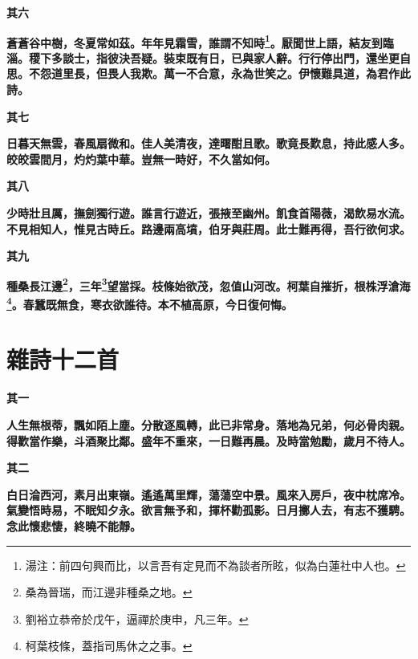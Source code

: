 \begin{quoting}\textbf{其六}\end{quoting}

\textbf{蒼蒼谷中樹，冬夏常如茲。年年見霜雪，誰謂不知時\footnote{湯注：前四句興而比，以言吾有定見而不為談者所眩，似為白蓮社中人也。}。厭聞世上語，結友到臨淄。稷下多談士，指彼決吾疑。裝束既有日，已與家人辭。行行停出門，還坐更自思。不怨道里長，但畏人我欺。萬一不合意，永為世笑之。伊懷難具道，為君作此詩。}

\begin{quoting}\textbf{其七}\end{quoting}

\textbf{日暮天無雲，春風扇微和。佳人美清夜，達曙酣且歌。歌竟長歎息，持此感人多。皎皎雲間月，灼灼葉中華。豈無一時好，不久當如何。}

\begin{quoting}\textbf{其八}\end{quoting}

\textbf{少時壯且厲，撫劍獨行遊。誰言行遊近，張掖至幽州。飢食首陽薇，渴飲易水流。不見相知人，惟見古時丘。路邊兩高墳，伯牙與莊周。此士難再得，吾行欲何求。}

\begin{quoting}\textbf{其九}\end{quoting}

\textbf{種桑長江邊\footnote{桑為晉瑞，而江邊非種桑之地。}，三年\footnote{劉裕立恭帝於戊午，逼禪於庚申，凡三年。}望當採。枝條始欲茂，忽值山河改。柯葉自摧折，根株浮滄海\footnote{柯葉枝條，蓋指司馬休之之事。}。春蠶既無食，寒衣欲誰待。本不植高原，今日復何悔。}

\section{雜詩十二首}

\begin{quoting}\textbf{其一}\end{quoting}

\textbf{人生無根蒂，飄如陌上塵。分散逐風轉，此已非常身。落地為兄弟，何必骨肉親。得歡當作樂，斗酒聚比鄰。盛年不重來，一日難再晨。及時當勉勵，歲月不待人。}

\begin{quoting}\textbf{其二}\end{quoting}

\textbf{白日淪西河，素月出東嶺。遙遙萬里輝，蕩蕩空中景。風來入房戶，夜中枕席冷。氣變悟時易，不眠知夕永。欲言無予和，揮杯勸孤影。日月擲人去，有志不獲騁。念此懷悲悽，終曉不能靜。}

